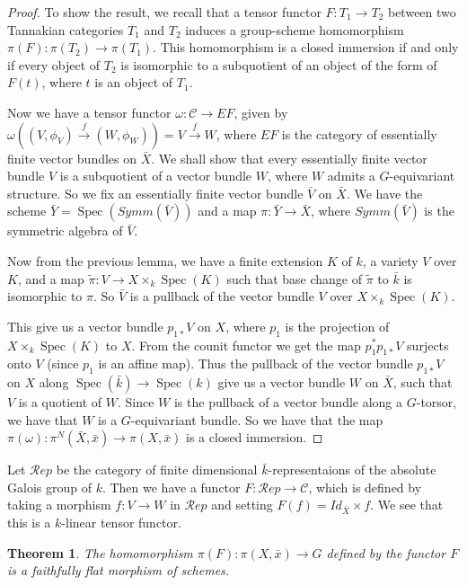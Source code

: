 \documentclass{article}
\newcommand{\spec}[1]{\operatorname{Spec}(#1)}
\newcommand{\cat}{\mathcal C} %
\newtheorem{theorem}{Theorem}
\begin{document}
\begin{proof}
  To show the result, we recall that a tensor functor $F:T_1 \rightarrow T_2$ between two Tannakian categories $T_1$ 
  and $T_2$ induces a group-scheme homomorphism $\pi(F):\pi(T_2)\rightarrow \pi(T_1)$. This homomorphism is a closed 
  immersion if and only if every object of $T_2$ is isomorphic to a subquotient of an object of the form of 
  $F(t)$, where $t$ is an object of $T_1$.

  Now we have a tensor functor $\omega:\cat \rightarrow EF$, given by $\omega((V,\phi_V)\xrightarrow f(W,\phi_W)) = 
  V\xrightarrow f W$, where $EF$ is the category of essentially finite vector bundles on $\bar X$. We shall show that 
  every essentially finite vector bundle $V$ is a subquotient of a vector bundle $W$, where $W$ admits a 
  $G$-equivariant structure. So we fix an essentially finite vector bundle $\bar V$ on $\bar X$. We have the scheme 
  $\bar Y =\spec {Symm (\bar V)}$ and a map $\pi :\bar  Y \rightarrow \bar X$, where $Symm(\bar V)$ is the symmetric 
  algebra of $\bar V$. 

  Now from the previous lemma, we have a finite extension $K$ of $k$, a variety $V$ over $K$, and a map 
  $\tilde \pi : V \rightarrow X \times _k \spec K$ such that base change of  $\tilde \pi$ to $\bar k$ is isomorphic
  to $\pi$. So $\bar V$ is a pullback of the vector bundle $V$ over $X \times_k \spec K$.

  This give us a vector bundle $p _{1*}V$ on $X$, where $p_1$ is the projection of $X \times _k \spec K$ to $X$. 
  From the counit functor we get the map $p_1^*p _{1*}V$ surjects onto $V$ (since $p_1$ is an affine map). 
  Thus the pullback of the vector bundle $p_{1*}V$ on $X$ along $\spec {\bar k} \rightarrow \spec k$ give us a vector
  bundle $W$ on $\bar X$, such that $V$ is a quotient of $W$. Since $W$ is the pullback of a vector bundle along a
  $G$-torsor, we have that $W$ is a $G$-equivariant bundle. So we have that the map 
  $\pi(\omega):\pi^N(\bar X, \bar x) \rightarrow \pi(X,\bar x)$ is a closed immersion.
\end{proof}

Let $\mathcal Rep$ be the category of finite dimensional $\bar k$-representaions of the absolute Galois group of
$k$. Then we have a functor $F:\mathcal Rep \rightarrow \cat$, which is defined by taking a morphism 
$f:V \rightarrow W$ in $\mathcal Rep$ and setting $F(f)=Id_{\bar X} \times f$. We see that this is a $k$-linear tensor
functor.

\begin{theorem}
  The homomorphism $\pi(F):\pi(X,\bar x) \rightarrow G$ defined by the functor $F$ is a faithfully flat morphism of 
  schemes. 
\end{theorem}
\end{document}
